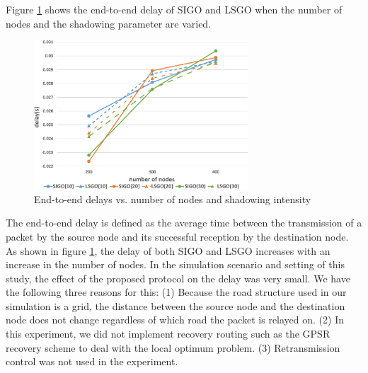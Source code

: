 \documentclass[conference]{IEEEtran}
\begin{document}
Figure \ref{fig:delay} shows the end-to-end delay of SIGO and LSGO when the number of nodes and the shadowing parameter are varied. 
\begin{figure}[htbp]
\centering\includegraphics[width=80mm]{figures/delay.eps}
\caption{End-to-end delays vs. number of nodes and shadowing intensity}
\label{fig:delay}
\end{figure}
The end-to-end delay is defined as the average time between the transmission of a packet by the source node and its successful reception by the destination node.
As shown in figure \ref{fig:delay}, the delay of both SIGO and LSGO increases with an increase in the number of nodes. In the simulation scenario and setting of this study, the effect of the proposed protocol on the delay was very small. 
We have the following three reasons for this: 
(1) Because the road structure used in our simulation is a grid, the distance between the source node and the destination node does not change regardless of which road the packet is relayed on.
(2) In this experiment, we did not implement recovery routing such as the GPSR recovery scheme to deal with the local optimum problem. (3) Retransmission control was not used in the experiment.



\end{document}
